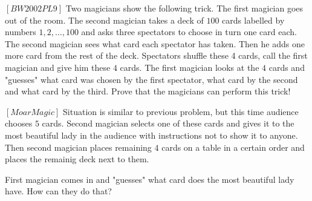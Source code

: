 \begin{problem}
$[BW2002PL9]$
Two magicians show the following trick. The first magician goes out of the room. The second magician takes a deck of $100$ cards labelled by numbers $1, 2, \dots , 100$ and asks three spectators to choose in turn one card each. The second magician sees what card each spectator has taken. Then he adds one more card from the rest of the deck. Spectators shuffle these 4 cards, call the first magician and give him these $4$ cards. The first magician looks at the $4$ cards and "guesses" what card was chosen by the first spectator, what card by the second and what card by the third. Prove that the magicians can perform this trick!
\end{problem}

\begin{problem}
$[MoarMagic]$
Situation is similar to previous problem, but this time audience chooses $5$ cards. Second magician selects one of these cards and gives it to the most beautiful lady in the audience with instructions not to show it to anyone. Then second magician places remaining $4$ cards on a table in a certain order and places the remainig deck next to them. 

First magician comes in and "guesses" what card does the most beautiful lady have. How can they do that?
\end{problem}



